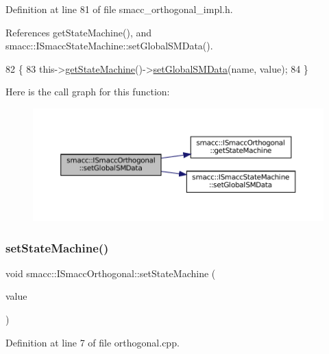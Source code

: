Definition at line 81 of file smacc\+\_\+orthogonal\+\_\+impl.\+h.



References get\+State\+Machine(), and smacc\+::\+I\+Smacc\+State\+Machine\+::set\+Global\+S\+M\+Data().


\begin{DoxyCode}
82 \{
83     this->\hyperlink{classsmacc_1_1ISmaccOrthogonal_aae265ec480b8ed552ddc79afd2d93a62}{getStateMachine}()->\hyperlink{classsmacc_1_1ISmaccStateMachine_a8588f9e580fbb95b53e2bd2ca3ff1f98}{setGlobalSMData}(name, value);
84 \}
\end{DoxyCode}
Here is the call graph for this function\+:
\nopagebreak
\begin{figure}[H]
\begin{center}
\leavevmode
\includegraphics[width=350pt]{classsmacc_1_1ISmaccOrthogonal_a2b5b15907fa6c7c6882717246f0633ab_cgraph}
\end{center}
\end{figure}
\mbox{\label{classsmacc_1_1ISmaccOrthogonal_a0fa0901a322f62a604c279c06d34f2f0}} 
\subsubsection{\texorpdfstring{set\+State\+Machine()}{setStateMachine()}}
{\footnotesize\ttfamily void smacc\+::\+I\+Smacc\+Orthogonal\+::set\+State\+Machine (\begin{DoxyParamCaption}\item[{\hyperlink{classsmacc_1_1ISmaccStateMachine}{I\+Smacc\+State\+Machine} $\ast$}]{value }\end{DoxyParamCaption})}



Definition at line 7 of file orthogonal.\+cpp.




